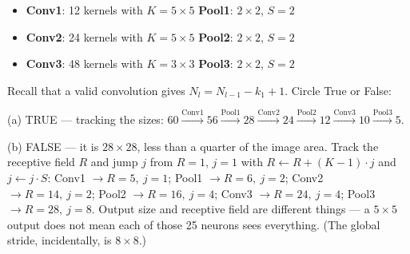 \documentclass[11pt]{exam}
\newcommand{\TFT}{\ifprintanswers\textbf{TRUE}\hspace{1.1em}False\else True\hspace{1.1em}False\fi}
\newcommand{\TFF}{True\hspace{1.1em}\ifprintanswers\textbf{FALSE}\else False\fi}
\begin{document}
\begin{questions}
\begin{itemize}
  \item \textbf{Conv1}: 12 kernels with $K = 5 \times 5$ \quad\textbf{Pool1}: $2\times2$, $S = 2$
  \item \textbf{Conv2}: 24 kernels with $K = 5 \times 5$ \quad\textbf{Pool2}: $2\times2$, $S = 2$
  \item \textbf{Conv3}: 48 kernels with $K = 3 \times 3$ \quad\textbf{Pool3}: $2\times2$, $S = 2$
\end{itemize}

\noindent Recall that a valid convolution gives $N_l = N_{l-1} - k_1 + 1$. Circle True or False:


\begin{solution}
  (a) TRUE --- tracking the sizes: $60 \xrightarrow{\text{Conv1}} 56 \xrightarrow{\text{Pool1}} 28
  \xrightarrow{\text{Conv2}} 24 \xrightarrow{\text{Pool2}} 12 \xrightarrow{\text{Conv3}} 10
  \xrightarrow{\text{Pool3}} 5$.

  (b) FALSE --- it is $28 \times 28$, less than a quarter of the image area. Track the receptive
  field $R$ and jump $j$ from $R = 1$, $j = 1$ with $R \leftarrow R + (K-1)\cdot j$ and
  $j \leftarrow j \cdot S$: Conv1 $\rightarrow R = 5,\ j = 1$; Pool1 $\rightarrow R = 6,\ j = 2$;
  Conv2 $\rightarrow R = 14,\ j = 2$; Pool2 $\rightarrow R = 16,\ j = 4$;
  Conv3 $\rightarrow R = 24,\ j = 4$; Pool3 $\rightarrow R = 28,\ j = 8$. Output size and receptive
  field are different things --- a $5 \times 5$ output does not mean each of those 25 neurons sees
  everything. (The global stride, incidentally, is $8 \times 8$.)


\end{solution}
\end{questions}
\end{document}
